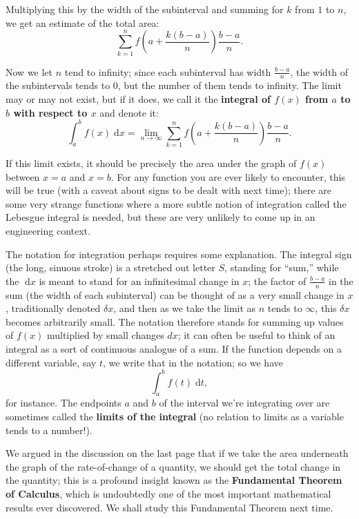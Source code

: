 \documentclass{article}
\newcommand{\diff}{\;\mathrm{d}}
\begin{document}
Multiplying this by the width of the subinterval and summing for $k$ from $1$ to $n$, we get an estimate of the total area:
\[\sum_{k=1}^nf\left(a+\frac{k(b-a)}{n}\right)\frac{b-a}{n}.\]

Now we let $n$ tend to infinity; since each subinterval has width $\frac{b-a}{n}$, the width of the subintervals tends to 0, but the number of them tends to infinity. The limit may or may not exist, but if it does, we call it the \textbf{integral of $f(x)$ from $a$ to $b$ with respect to $x$} and denote it:
\[\int_a^bf(x)\diff x=\lim_{n\to\infty}\sum_{k=1}^n f\left(a+\frac{k(b-a)}{n}\right)\frac{b-a}{n}.\]

If this limit exists, it should be precisely the area under the graph of $f(x)$ between $x=a$ and $x=b$. For any function you are ever likely to encounter, this will be true (with a caveat about signs to be dealt with next time); there are some very strange functions where a more subtle notion of integration called the Lebesgue integral is needed, but these are very unlikely to come up in an engineering context.

The notation for integration perhaps requires some explanation. The integral sign (the long, sinuous stroke) is a stretched out letter $S$, standing for ``sum,'' while the $\diff x$ is meant to stand for an infinitesimal change in $x$; the factor of $\frac{b-a}{n}$ in the sum (the width of each subinterval) can be thought of as a very small change in $x$, traditionally denoted $\delta x$, and then as we take the limit as $n$ tends to $\infty$, this $\delta x$ becomes arbitrarily small. The notation therefore stands for summing up values of $f(x)$ multiplied by small changes $dx$; it can often be useful to think of an integral as a sort of continuous analogue of a sum. If the function depends on a different variable, say $t$, we write that in the notation; so we have
\[\int_a^b f(t)\diff t,\]
for instance. The endpoints $a$ and $b$ of the interval we're integrating over are sometimes called the \textbf{limits of the integral} (no relation to limits as a variable tends to a number!).\bigskip



We argued in the discussion on the last page that if we take the area underneath the graph of the rate-of-change of a quantity, we should get the total change in the quantity; this is a profound insight known as the \textbf{Fundamental Theorem of Calculus}, which is undoubtedly one of the most important mathematical results ever discovered. We shall study this Fundamental Theorem next time.
\end{document}
